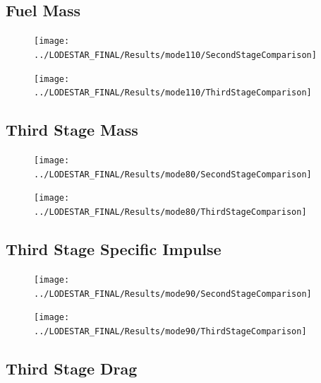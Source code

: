 \subsection{Fuel Mass}\label{sec:app_comparison110}
\begin{figure}[th]
\centering
\texttt{[image: ../LODESTAR\_FINAL/Results/mode110/SecondStageComparison]}
\caption{}
\label{fig:SecondStageComparison5}
\end{figure}

\begin{figure}[th]
\centering
\texttt{[image: ../LODESTAR\_FINAL/Results/mode110/ThirdStageComparison]}
\caption{}
\label{fig:ThirdStageComparison5}
\end{figure}
\FloatBarrier
\subsection{Third Stage Mass}\label{sec:app_comparison80}

\begin{figure}[th]
\centering
\texttt{[image: ../LODESTAR\_FINAL/Results/mode80/SecondStageComparison]}
\caption{}
\label{fig:SecondStageComparison6}
\end{figure}


\begin{figure}[th]
\centering
\texttt{[image: ../LODESTAR\_FINAL/Results/mode80/ThirdStageComparison]}
\caption{}
\label{fig:ThirdStageComparison6}
\end{figure}

\FloatBarrier
\subsection{Third Stage Specific Impulse}\label{sec:app_comparison90}

\begin{figure}[th]
	\centering
	\texttt{[image: ../LODESTAR\_FINAL/Results/mode90/SecondStageComparison]}
	\caption{}
	\label{fig:SecondStageComparison7}
\end{figure}

\begin{figure}[th]
\centering
\texttt{[image: ../LODESTAR\_FINAL/Results/mode90/ThirdStageComparison]}
\caption{}
\label{fig:ThirdStageComparison7}
\end{figure}
\FloatBarrier
\subsection{Third Stage Drag}\label{sec:app_comparison70}

